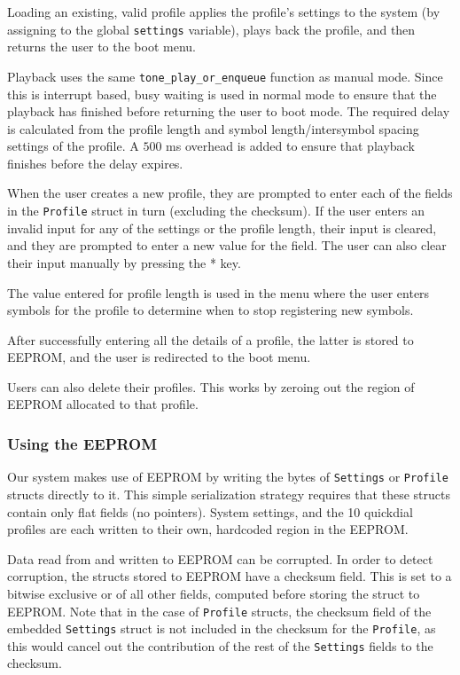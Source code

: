 \documentclass[11pt,a4paper,twocolumn]{scrartcl}
\begin{document}
Loading an existing, valid profile applies the profile's settings to the system (by assigning to the global \verb!settings! variable), plays back the profile, and then returns the user to the boot menu. 

Playback uses the same \verb!tone_play_or_enqueue! function as manual mode. Since this is interrupt based, busy waiting is used in normal mode to ensure that the playback has finished before returning the user to boot mode. The required delay is calculated from the profile length and symbol length/intersymbol spacing settings of the profile. A $500$ ms overhead is added to ensure that playback finishes before the delay expires.

When the user creates a new profile, they are prompted to enter each of the fields in the \verb!Profile! struct in turn (excluding the checksum). If the user enters an invalid input for any of the settings or the profile length, their input is cleared, and they are prompted to enter a new value for the field. The user can also clear their input manually by pressing the * key.

The value entered for profile length is used in the menu where the user enters symbols for the profile to determine when to stop registering new symbols. 

After successfully entering all the details of a profile, the latter is stored to EEPROM, and the user is redirected to the boot menu.

Users can also delete their profiles. This works by zeroing out the region of EEPROM allocated to that profile.

\subsubsection{Using the EEPROM}

Our system makes use of EEPROM by writing the bytes of \verb!Settings! or \verb!Profile! structs directly to it. This simple serialization strategy requires that these structs contain only flat fields (no pointers). System settings, and the 10 quickdial profiles are each written to their own, hardcoded region in the EEPROM.

Data read from and written to EEPROM can be corrupted. In order to detect corruption, the structs stored to EEPROM have a checksum field. This is set to a bitwise exclusive or of all other fields, computed before storing the struct to EEPROM. Note that in the case of \verb!Profile! structs, the checksum field of the embedded \verb!Settings! struct is not included in the checksum for the \verb!Profile!, as this would cancel out the contribution of the rest of the \verb!Settings! fields to the checksum.
\end{document}
